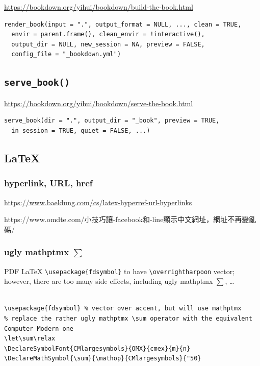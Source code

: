 \documentclass[
]{book}
\theoremstyle{definition}
\theoremstyle{definition}
\theoremstyle{definition}
\theoremstyle{definition}
\theoremstyle{remark}
\begin{document}
\url{https://bookdown.org/yihui/bookdown/build-the-book.html}

\begin{verbatim}
render_book(input = ".", output_format = NULL, ..., clean = TRUE,
  envir = parent.frame(), clean_envir = !interactive(),
  output_dir = NULL, new_session = NA, preview = FALSE,
  config_file = "_bookdown.yml")
\end{verbatim}

\subsection{\texorpdfstring{\texttt{serve\_book()}}{serve\_book()}}\label{serve_book}

\url{https://bookdown.org/yihui/bookdown/serve-the-book.html}

\begin{verbatim}
serve_book(dir = ".", output_dir = "_book", preview = TRUE,
  in_session = TRUE, quiet = FALSE, ...)
\end{verbatim}

\subsection{LaTeX}\label{latex-1}

\subsubsection{hyperlink, URL, href}\label{hyperlink-url-href}

\url{https://www.baeldung.com/cs/latex-hyperref-url-hyperlinks}

\begin{CJK}{UTF8}{bsmi}
https://www.omdte.com/小技巧讓-facebook和-line顯示中文網址，網址不再變亂碼/
\end{CJK}

\subsubsection{\texorpdfstring{ugly mathptmx \(\sum\)}{ugly mathptmx \textbackslash sum}}\label{ugly-mathptmx-sum}

PDF LaTeX \texttt{\textbackslash{}usepackage\{fdsymbol\}} to have \texttt{\textbackslash{}overrightharpoon} vector; however, there are too many side effects, including ugly mathptmx \(\sum\), \ldots{}

\begin{verbatim}

\usepackage{fdsymbol} % vector over accent, but will use mathptmx
% replace the rather ugly mathptmx \sum operator with the equivalent Computer Modern one
\let\sum\relax
\DeclareSymbolFont{CMlargesymbols}{OMX}{cmex}{m}{n}
\DeclareMathSymbol{\sum}{\mathop}{CMlargesymbols}{"50}
\end{verbatim}
\end{document}
